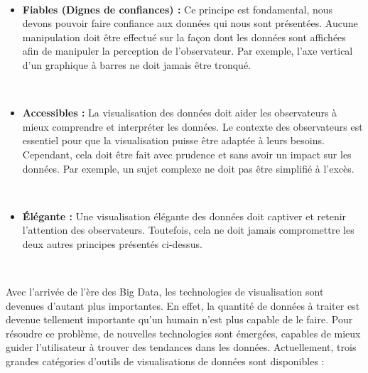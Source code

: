 ~

\begin{itemize}
  \item \textbf{Fiables (Dignes de confiances) :} Ce principe est fondamental, nous devons pouvoir faire confiance aux données qui nous sont présentées. Aucune manipulation doit être effectué sur la façon dont les données sont affichées afin de manipuler la perception de l’observateur. Par exemple, l’axe vertical d’un graphique à barres ne doit jamais être tronqué.

  ~

  \item \textbf{Accessibles :} La visualisation des données doit aider les observateurs à mieux comprendre et interpréter les données. Le contexte des observateurs est essentiel pour que la visualisation puisse être adaptée à leurs besoins. Cependant, cela doit être fait avec prudence et sans avoir un impact sur les données. Par exemple, un sujet complexe ne doit pas être simplifié à l'excès.

  ~

  \item \textbf{Élégante :} Une visualisation élégante des données doit captiver et retenir l’attention des observateurs. Toutefois, cela ne doit jamais compromettre les deux autres principes présentés ci-dessus.


\end{itemize}


~


\noindent
Avec l'arrivée de l'ère des Big Data, les technologies de visualisation sont devenues d'autant plus importantes. En effet, la quantité de données à traiter est devenue tellement importante qu'un humain n'est plus capable de le faire. Pour résoudre ce problème, de nouvelles technologies sont émergées, capables de mieux guider l'utilisateur à trouver des tendances dans les données. Actuellement, trois grandes catégories d'outils de visualisations de données sont disponibles :

~

